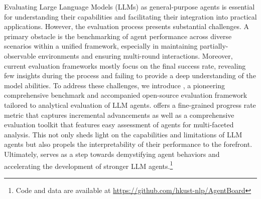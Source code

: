\setcounter{footnote}{1}
Evaluating Large Language Models (LLMs) as general-purpose agents is essential for understanding their capabilities and facilitating their integration into practical applications. However, the evaluation process presents substantial challenges. A primary obstacle is the benchmarking of agent performance across diverse scenarios within a unified framework, especially in maintaining partially-observable environments and ensuring multi-round interactions. Moreover, current evaluation frameworks mostly focus on the final success rate, revealing few insights during the process and failing to provide a deep understanding of the model abilities. 
To address these challenges, we introduce \BenchName{}, a pioneering comprehensive benchmark and accompanied open-source evaluation framework tailored to analytical evaluation of LLM agents. \BenchName{} offers a fine-grained progress rate metric that captures incremental advancements as well as a comprehensive evaluation toolkit that features easy assessment of agents for 
multi-faceted analysis. This not only sheds light on the capabilities and limitations of LLM agents but also propels the interpretability of their performance to the forefront. Ultimately, \BenchName{} serves as a step towards demystifying agent behaviors and accelerating the development of stronger LLM agents.\footnote[1]{Code and data are available at \href{https://github.com/hkust-nlp/AgentBoard}{https://github.com/hkust-nlp/AgentBoard}}

